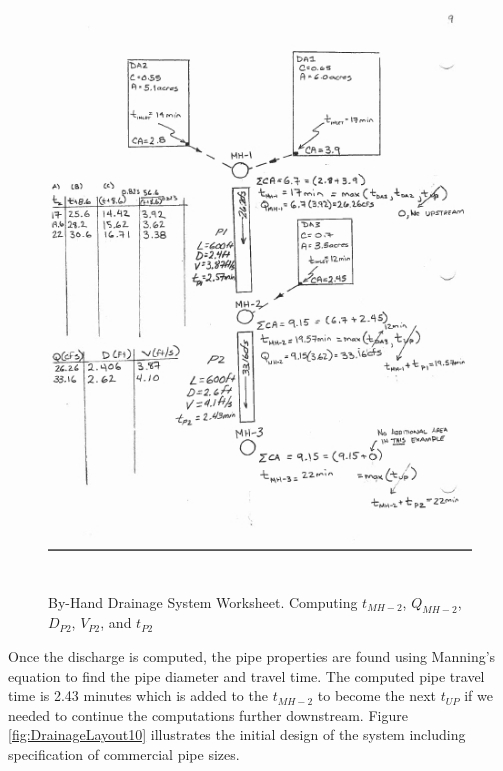 \documentclass[12pt]{article}
\begin{document}
\begin{figure}[ht!] %
\centering
   \includegraphics[height=6.5in]{DrainageLayout9.jpg}
   \caption{By-Hand Drainage System Worksheet. Computing $t_{MH-2}$, $Q_{MH-2}$, $D_{P2}$, $V_{P2}$, and $t_{P2}$}
   \label{fig:DrainageLayout9} 
\end{figure}

Once the discharge is computed, the pipe properties are found using Manning's equation to find the pipe diameter and travel time.
The computed pipe travel time is 2.43 minutes which is added to the $t_{MH-2}$ to become the next $t_{UP}$ if we needed to continue the computations further downstream.
\clearpage 
Figure \ref{fig:DrainageLayout10} illustrates the initial design of the system including specification of commercial pipe sizes.
\end{document}

